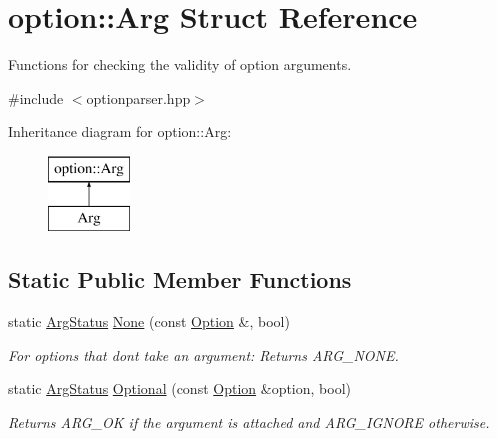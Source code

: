 \hypertarget{structoption_1_1Arg}{}\section{option\+:\+:Arg Struct Reference}
\label{structoption_1_1Arg}


Functions for checking the validity of option arguments.  




{\ttfamily \#include $<$optionparser.\+hpp$>$}

Inheritance diagram for option\+:\+:Arg\+:\begin{figure}[H]
\begin{center}
\leavevmode
\includegraphics[height=2.000000cm]{structoption_1_1Arg}
\end{center}
\end{figure}
\subsection*{Static Public Member Functions}
\begin{DoxyCompactItemize}
\item 
\mbox{\label{structoption_1_1Arg_a7fc01987899c91c6b6a1be5711a46e22}} 
static \hyperlink{namespaceoption_aee8c76a07877335762631491e7a5a1a9}{Arg\+Status} \hyperlink{structoption_1_1Arg_a7fc01987899c91c6b6a1be5711a46e22}{None} (const \hyperlink{classoption_1_1Option}{Option} \&, bool)
\begin{DoxyCompactList}\small\item\em For options that don\textquotesingle{}t take an argument\+: Returns A\+R\+G\+\_\+\+N\+O\+NE. \end{DoxyCompactList}\item 
\mbox{\label{structoption_1_1Arg_aadb5316ecbc9eb0a7f0019d14bf35ad0}} 
static \hyperlink{namespaceoption_aee8c76a07877335762631491e7a5a1a9}{Arg\+Status} \hyperlink{structoption_1_1Arg_aadb5316ecbc9eb0a7f0019d14bf35ad0}{Optional} (const \hyperlink{classoption_1_1Option}{Option} \&option, bool)
\begin{DoxyCompactList}\small\item\em Returns A\+R\+G\+\_\+\+OK if the argument is attached and A\+R\+G\+\_\+\+I\+G\+N\+O\+RE otherwise. \end{DoxyCompactList}\end{DoxyCompactItemize}


